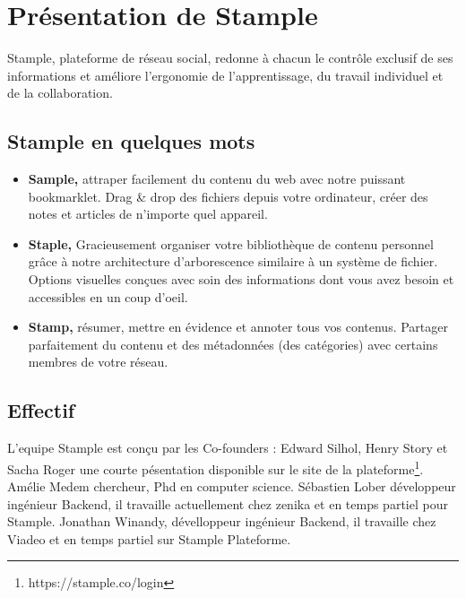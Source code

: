 \documentclass[12pt,oneside,a4paper]{article}
\begin{document}
\section{Présentation de Stample}
Stample, plateforme de réseau social, redonne à chacun le contrôle exclusif de ses informations et améliore l'ergonomie de l'apprentissage, du travail individuel et de la collaboration.
\subsection{Stample en quelques mots}
\begin{itemize}
\item \textbf{Sample,} attraper facilement du contenu du web avec notre puissant bookmarklet. Drag \& drop des fichiers depuis votre ordinateur, créer des notes et articles de n'importe quel appareil.
\item \textbf{Staple,} Gracieusement organiser votre bibliothèque de contenu personnel grâce à notre architecture d'arborescence similaire à un système de fichier.
Options visuelles conçues avec soin des informations dont vous avez besoin et accessibles en un coup d'oeil.
\item \textbf{Stamp,} résumer, mettre en évidence et annoter tous vos contenus.
Partager parfaitement du contenu et des métadonnées (des catégories) avec certains membres de votre réseau.
\end{itemize}
\subsection{Effectif}
L'equipe Stample est conçu par les Co-founders :
Edward Silhol, Henry Story et Sacha Roger une courte pésentation disponible sur le site de la plateforme\footnote{https://stample.co/login}.
Amélie Medem chercheur, Phd en computer science.
Sébastien Lober développeur ingénieur Backend, il travaille actuellement chez zenika et en temps partiel pour Stample.
Jonathan Winandy, dévelloppeur ingénieur Backend, il travaille chez Viadeo et en temps partiel sur Stample Plateforme.
\end{document}
